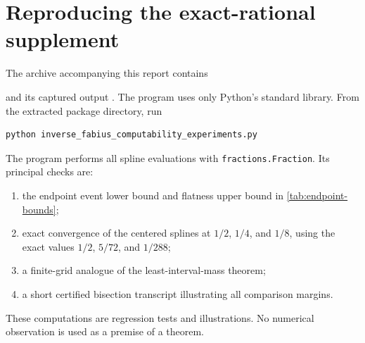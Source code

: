 \documentclass[11pt,oneside]{article}
\theoremstyle{definition}
\theoremstyle{remark}
\numberwithin{equation}{section}
\begin{document}
\section{Reproducing the exact-rational supplement}
\label{app:reproduction}

The archive accompanying this report contains
\begin{center}
\end{center}
and its captured output .  The program uses only
Python's standard library.  From the extracted package directory, run

\begin{lstlisting}[style=reportpseudo,language={}]
python inverse_fabius_computability_experiments.py
\end{lstlisting}

The program performs all spline evaluations with
\texttt{fractions.Fraction}.  Its principal checks are:

\begin{enumerate}
\item the endpoint event lower bound and flatness upper bound in
      \cref{tab:endpoint-bounds};
\item exact convergence of the centered splines at $1/2$, $1/4$, and $1/8$,
      using the exact values $1/2$, $5/72$, and $1/288$;
\item a finite-grid analogue of the least-interval-mass theorem;
\item a short certified bisection transcript illustrating all comparison
      margins.
\end{enumerate}

These computations are regression tests and illustrations.  No numerical
observation is used as a premise of a theorem.
\end{document}
